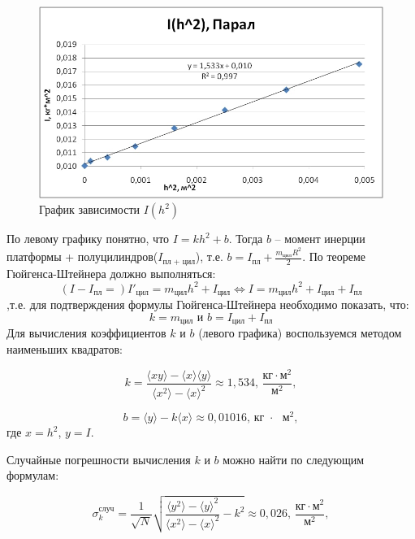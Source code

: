 \documentclass[a4paper,14pt]{extarticle}
\begin{document}
	\begin{figure}[!h]
		\begin{center}
			\includegraphics[width=1\textwidth]{graph_1}
			\caption{График зависимости $ I(h^2) $}
			\label{ris:grafik}
		\end{center}
	\end{figure}

	По левому графику понятно, что $I = kh^2 + b$. 
	Тогда $b$ -- момент инерции платформы + полуцилиндров($I_\text{пл + цил}$), т.е. $b = I_\text{пл} + \frac{m_\text{цил} R^2}{2}$. 
	\newpage
	По теореме Гюйгенса-Штейнера должно выполняться:
	$$(I - I_\text{пл} =) I'_\text{цил} = m_\text{цил} h^2 + I_\text{цил} \Leftrightarrow I = m_\text{цил} h^2 + I_\text{цил} + I_\text{пл} $$
,т.е. для подтверждения формулы Гюйгенса-Штейнера необходимо показать, что:
$$k = m_\text{цил} \text{ и } b = I_\text{цил} + I_\text{пл}$$
 Для вычисления коэффициентов $ k $ и $ b $ (левого графика) воспользуемся методом наименьших квадратов:
		
	\begin{equation}
		k=\frac{\langle xy\rangle-\langle x\rangle \langle y\rangle}{\langle x^2\rangle - \langle x\rangle^2}\approx 1,534\text{, } \frac{\text{кг}\cdot\text{м}^2}{\text{м}^2},
	\end{equation}
	
	\begin{equation}
		b=\langle y \rangle -k\langle x \rangle\approx 0,01016\text{,  кг $\cdot$ $\text{м}^2$},
	\end{equation}
	где $ x=h^2 $, $ y=I $.
	
	Случайные погрешности вычисления $ k $ и $ b $ можно найти по следующим формулам:
	
	\begin{equation}
		\sigma_k^\text{случ}=\frac{1}{\sqrt{N}}\sqrt{\frac{\langle y^2 \rangle - \langle y \rangle^2}{\langle x^2 \rangle - \langle x \rangle^2} - k^2  } \approx 0,026
		 \text{, } \frac{\text{кг}\cdot\text{м}^2}{\text{м}^2},
	\end{equation}
	
\end{document}
